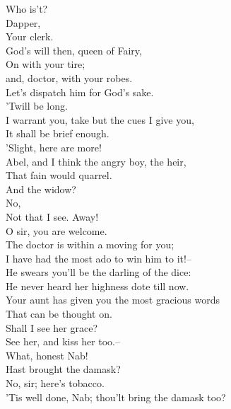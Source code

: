 \documentclass{memoir}
\begin{document}
\begin{drama*}
\subtlespeaks  Who is't?\\
\dolspeaks {} Dapper,\\
 Your clerk.\\
\facespeaks {} God's will then, queen of Fairy,\\
 On with your tire;\\
 and, doctor, with your robes.\\
 Let's dispatch him for God's sake.\\
\subtlespeaks {} 'Twill be long.\\
\facespeaks  I warrant you, take but the cues I give you,\\
 It shall be brief enough.\\
 'Slight, here are more!\\
 Abel, and I think the angry boy, the heir,\\
 That fain would quarrel.\\
\subtlespeaks {} And the widow?\\
\facespeaks {} No,\\
 Not that I see. Away!\\
 O sir, you are welcome.\\
 The doctor is within a moving for you;\\
 I have had the most ado to win him to it!--\\
 He swears you'll be the darling of the dice:\\
 He never heard her highness dote till now.\\
 Your aunt has given you the most gracious words\\
 That can be thought on.\\
\dapperspeaks {} Shall I see her grace?\\
\facespeaks  See her, and kiss her too.--\\
 What, honest Nab!\\
 Hast brought the damask?\\
\druggerspeaks {} No, sir; here's tobacco.\\
\facespeaks  'Tis well done, Nab; thou'lt bring the damask too?\\

\end{drama*}
\end{document}
